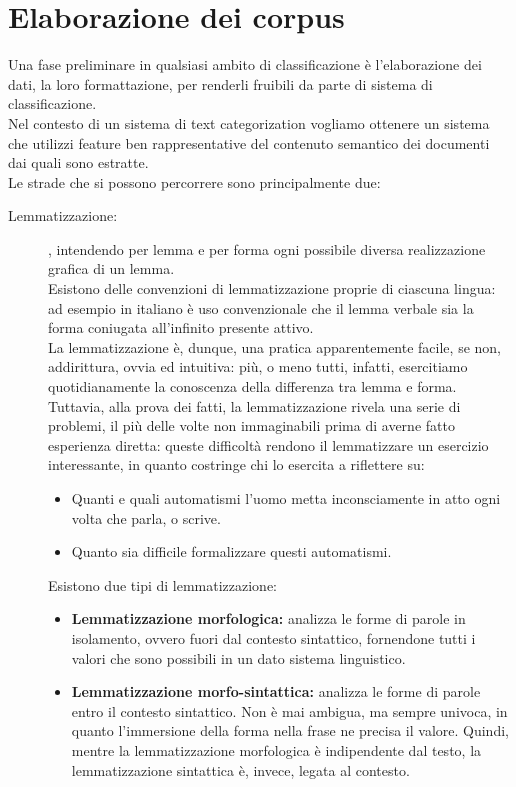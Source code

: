\documentclass{article}
\theoremstyle{plain}
\theoremstyle{definition}
\begin{document}
\newpage
\section{Elaborazione dei corpus}
Una fase preliminare in qualsiasi ambito di classificazione è l'elaborazione dei dati, la loro formattazione, per renderli fruibili da parte di sistema di classificazione.
\\Nel contesto di un sistema di text categorization vogliamo ottenere un sistema che utilizzi feature ben rappresentative del contenuto semantico dei documenti dai quali sono estratte.
\\
Le strade che si possono percorrere sono principalmente due:

\begin{description}
\item [Lemmatizzazione:] , intendendo per lemma  e per forma ogni possibile diversa realizzazione grafica di un lemma.\footnotemark
{}
\\
Esistono delle convenzioni di lemmatizzazione proprie di ciascuna lingua: ad esempio in italiano è uso convenzionale che il lemma verbale sia la forma coniugata all'infinito presente attivo.
\\
La lemmatizzazione è, dunque, una pratica apparentemente facile, se non, addirittura, ovvia ed intuitiva: più, o meno tutti, infatti, esercitiamo quotidianamente la conoscenza della differenza tra lemma e forma. Tuttavia, alla prova dei fatti, la lemmatizzazione rivela una serie di problemi, il più delle volte non immaginabili prima di averne fatto esperienza diretta: queste difficoltà rendono il lemmatizzare un esercizio interessante, in quanto costringe chi lo esercita a riflettere su:

\begin{itemize}  
\item Quanti e quali automatismi l'uomo metta inconsciamente in atto ogni volta che parla, o scrive.
\item Quanto sia difficile formalizzare questi automatismi.
\end{itemize}

Esistono due tipi di lemmatizzazione:

\begin{itemize}  
\item \textbf{Lemmatizzazione morfologica:} analizza le forme di parole in isolamento, ovvero fuori dal contesto sintattico, fornendone tutti i valori che sono possibili in un dato sistema linguistico.
\item \textbf{Lemmatizzazione morfo-sintattica:} analizza le forme di parole entro il contesto sintattico. Non è mai ambigua, ma sempre univoca, in quanto l'immersione della forma nella frase ne precisa il valore. Quindi, mentre la lemmatizzazione morfologica è indipendente dal testo, la lemmatizzazione sintattica è, invece, legata al contesto.
\end{itemize}
  

\end{description}
\end{document}
